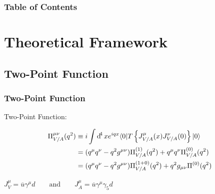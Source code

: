 \documentclass[fleqn]{beamer}
\begin{document}
\begin{frame}
  \frametitle{Table of Contents}
  \tableofcontents[subsubsectionstyle=hide]
\end{frame} 

\section{Theoretical Framework}
\subsection{Two-Point Function}
\begin{frame}
  \frametitle{Two-Point Function}
  \begin{block}{Two-Point Function:}
    \begin{ceqn}
      \begin{equation}
        \begin{split}
          \Pi_{V/A}^{\mu\nu}(q^2) &\equiv i \int \dif^4 x e^{iqx} \langle 0\vert T \left\{ J_{V/A}^\mu(x) J_{V/A}^\nu(0)\right\} \vert 0 \rangle \\
          &= (q^\mu q^\nu - q^2 g^{\mu\nu})\Pi_{V/A}^{(1)}(q^2) + q^\mu q^\nu \Pi_{V/A}^{(0)}(q^2) \\
          &= (q^\mu q^\nu - q^2 g^{\mu\nu}) \Pi^{(1+0)}_{V/A}(q^2) + q^2 g_{\mu\nu} \Pi^{(0)}(q^2) 
        \end{split}
      \end{equation}
    \end{ceqn}
  \end{block}

  \vspace{0.5cm}

  \small\centering
  \(J_V^\mu = \overline{u} \gamma^\mu d \qquad \text{and} \qquad J_A^\mu = \overline{u} \gamma^\mu \gamma_5 d\)
\end{frame}
\end{document}
